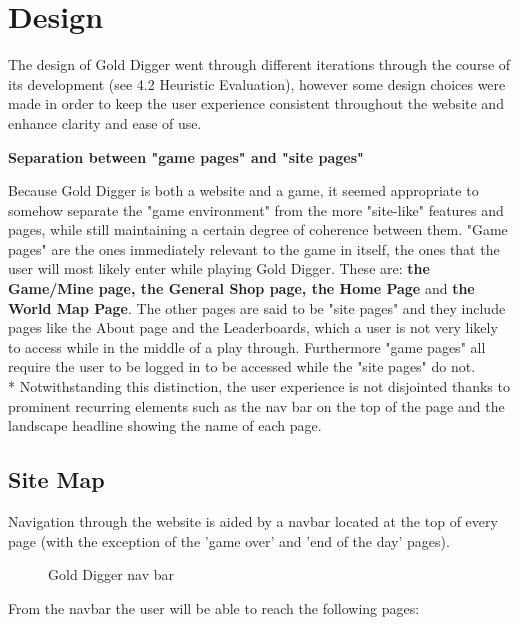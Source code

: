 \documentclass{mproj}
\begin{document}
\chapter{Design}\label{design}

The design of Gold Digger went through different iterations through the course of its development (see 4.2 Heuristic Evaluation), however some design choices were made in order to keep the user experience consistent throughout the website and enhance clarity and ease of use.

\textbf{Separation between "game pages" and "site pages"}

Because Gold Digger is both a website and a game, it seemed appropriate to somehow separate the "game environment" from the more "site-like" features and pages, while still maintaining a certain degree of coherence between them. "Game pages" are the ones immediately relevant to the game in itself, the ones that the user will most likely enter while playing Gold Digger. These are: \textbf{the Game/Mine page, the General Shop page, the Home Page} and \textbf{the World Map Page}. The other pages are said to be "site pages" and they include pages like the About page and the Leaderboards, which a user is not very likely to access while in the middle of a play through. Furthermore "game pages" all require the user to be logged in to be accessed while the "site pages" do not. 
\\*
Notwithstanding this distinction, the user experience is not disjointed thanks to prominent recurring elements such as the nav bar on the top of the page and the landscape headline showing the name of each page.

\section{Site Map}

Navigation through the website is aided by a navbar located at the top of every page (with the exception of the 'game over' and 'end of the day'
pages). 
\begin{figure} [h] 
	\centering
	\caption{Gold Digger nav bar}
           \label{navbar}
\end{figure}

From the navbar the user will be able to reach the following pages:
\end{document}
